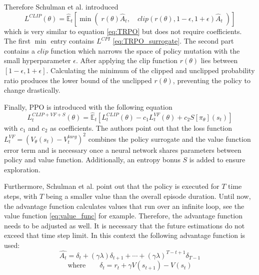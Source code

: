 Therefore Schulman et al. introduced
\begin{equation}\label{eq:PPO}
    L^{CLIP}(\theta) = \hat{\mathbb{E}}_{t} \left[ \min \left( \; r(\theta)\hat{A}_{t}, \quad clip(r(\theta), 1-\epsilon, 1+\epsilon)\hat{A}_{t} \; \right) \right]
\end{equation}
which is very similar to equation \eqref{eq:TRPO} but does not require coefficients. The first $\min$ entry contains $L^{CPI}$ \eqref{eq:TRPO_surrogate}. The second part contains a $clip$ function which narrows the space of policy mutation with the small hyperparameter $\epsilon$. After applying the clip function $r(\theta)$ lies between $[1-\epsilon,1+\epsilon]$. Calculating the minimum of the clipped and unclipped probability ratio produces the lower bound of the unclipped $r(\theta)$, preventing the policy to change drastically.

Finally, PPO is introduced with the following equation
\begin{equation}\label{eq:PPO_algo}
    L_{t}^{CLIP+VF+S}(\theta) = \hat{\mathbb{E}}_{t} \left[ L_{t}^{CLIP}(\theta) - c_{1}L_{t}^{VF}(\theta) + c_{2}S[\pi_{\theta}](s_{t}) \right]
\end{equation}
with $c_{1}$ and $c_{2}$ as coefficients. The authors point out that the loss function \\
$L_{t}^{VF} = (V_{\theta}(s_{t})-V_{t}^{targ})^2$ combines the policy surrogate and the value function error term and is necessary once a neural network shares parameters between policy and value function. Additionally, an entropy bonus $S$ is added to ensure exploration.

Furthermore, Schulman et al. point out that the policy is executed for $T$ time steps, with $T$ being a smaller value than the overall episode duration. Until now, the advantage function calculates values that run over an infinite loop, see the value function \eqref{eq:value_func} for example. Therefore, the advantage function needs to be adjusted as well. It is necessary that the future estimations do not exceed that time step limit. In this context the following advantage function is used:
\begin{equation}\label{eq:advantage_func}
    \hat{A_t} = \delta_t+(\gamma \lambda)\delta_{t+1}+ \cdots + (\gamma \lambda)^{T-t+1}\delta_{T-1}
\end{equation}
\begin{equation}\label{eq:advantage_func_delta}
    \textrm{where} \qquad \delta_t = r_t + \gamma V(s_{t+1}) - V(s_t)
\end{equation}


